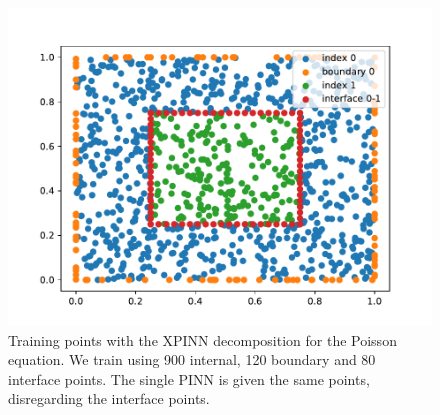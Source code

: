 \begin{figure}[h]
    \centering
    \includegraphics[width=\linewidth]{Project1XPINNs/figures/Poisson/xpinn_decomp.pdf}
    \caption{Training points with the XPINN decomposition for the Poisson equation. We train using 900 internal, 120 boundary and 80 interface points. The single PINN is given the same points, disregarding the interface points.}
    \label{fig:decomp_poisson}
\end{figure}

